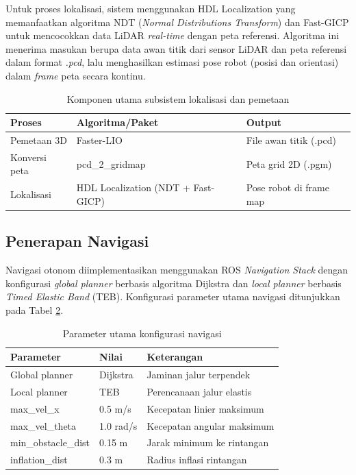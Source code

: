 Untuk proses lokalisasi, sistem menggunakan HDL Localization yang memanfaatkan algoritma NDT (\textit{Normal Distributions Transform}) dan Fast-GICP untuk mencocokkan data LiDAR \textit{real-time} dengan peta referensi. Algoritma ini menerima masukan berupa data awan titik dari sensor LiDAR dan peta referensi dalam format \textit{.pcd}, lalu menghasilkan estimasi pose robot (posisi dan orientasi) dalam \textit{frame} peta secara kontinu.

\begin{table}[H]
\centering
\caption{Komponen utama subsistem lokalisasi dan pemetaan}
\label{tab:slam-komponen}
\begin{tabular}{|l|l|l|}
\hline
\textbf{Proses} & \textbf{Algoritma/Paket} & \textbf{Output} \\ \hline
Pemetaan 3D & Faster-LIO & File awan titik (.pcd) \\ \hline
Konversi peta & pcd\_2\_gridmap & Peta grid 2D (.pgm) \\ \hline
Lokalisasi & HDL Localization (NDT + Fast-GICP) & Pose robot di frame map \\ \hline
\end{tabular}
\end{table}

\subsection{Penerapan Navigasi}

Navigasi otonom diimplementasikan menggunakan ROS \textit{Navigation Stack} dengan konfigurasi \textit{global planner} berbasis algoritma Dijkstra dan \textit{local planner} berbasis \textit{Timed Elastic Band} (TEB). Konfigurasi parameter utama navigasi ditunjukkan pada Tabel \ref{tab:nav-params}.

\begin{table}[H]
\centering
\caption{Parameter utama konfigurasi navigasi}
\label{tab:nav-params}
\begin{tabular}{|l|l|l|}
\hline
\textbf{Parameter} & \textbf{Nilai} & \textbf{Keterangan} \\ \hline
Global planner & Dijkstra & Jaminan jalur terpendek \\ \hline
Local planner & TEB & Perencanaan jalur elastis \\ \hline
max\_vel\_x & 0.5 m/s & Kecepatan linier maksimum \\ \hline
max\_vel\_theta & 1.0 rad/s & Kecepatan angular maksimum \\ \hline
min\_obstacle\_dist & 0.15 m & Jarak minimum ke rintangan \\ \hline
inflation\_dist & 0.3 m & Radius inflasi rintangan \\ \hline
\end{tabular}
\end{table}

